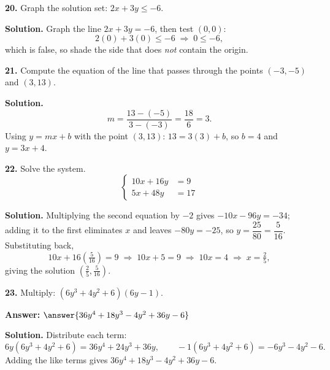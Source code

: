 \documentclass{ximera}
\begin{document}
\begin{problem}

\textbf{20.} Graph the solution set: $2x+3y \le -6$.

\begin{hint}
\textbf{Solution.} Graph the line $2x+3y=-6$, then test $(0,0)$:
\[
  2(0)+3(0) \le -6 \;\Longrightarrow\; 0 \le -6,
\]
which is false, so shade the side that does \emph{not} contain the origin.
\figbox{\gridsm}
\end{hint}
\end{problem}

\begin{problem}

\textbf{21.} Compute the equation of the line that passes through the points $(-3,-5)$
and $(3,13)$.

\begin{hint}
\textbf{Solution.}
\[
  m=\frac{13-(-5)}{3-(-3)}=\frac{18}{6}=3 .
\]
Using $y=mx+b$ with the point $(3,13)$: $13=3(3)+b$, so $b=4$ and $y=3x+4$.
\end{hint}
\end{problem}

\begin{problem}

\textbf{22.} Solve the system.
\[
  \left\{\begin{aligned}
    10x+16y &= 9 \\
    5x+48y &= 17
  \end{aligned}\right.
\]

\begin{hint}
\textbf{Solution.} Multiplying the second equation by $-2$ gives
$-10x-96y=-34$; adding it to the first eliminates $x$ and leaves $-80y=-25$, so
$y=\dfrac{25}{80}=\dfrac{5}{16}$. Substituting back,
\[
  10x+16\left(\tfrac{5}{16}\right)=9 \;\Longrightarrow\; 10x+5=9
  \;\Longrightarrow\; 10x=4 \;\Longrightarrow\; x=\tfrac{2}{5},
\]
giving the solution $\left(\tfrac{2}{5},\tfrac{5}{16}\right)$.
\end{hint}
\end{problem}

\begin{problem}
\textbf{23.} Multiply: $\left(6y^{3}+4y^{2}+6\right)(6y-1)$.

\textbf{Answer:} $\answer{36y^4+18y^3-4y^2+36y-6}$

\begin{hint}
\textbf{Solution.} Distribute each term:
\[
6y(6y^{3}+4y^{2}+6)=36y^{4}+24y^{3}+36y,\qquad -1(6y^{3}+4y^{2}+6)=-6y^{3}-4y^{2}-6 .
\]
Adding the like terms gives $36y^{4}+18y^{3}-4y^{2}+36y-6$.
\end{hint}
\end{problem}
\end{document}

